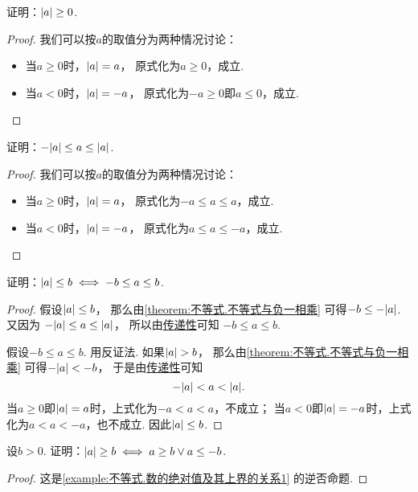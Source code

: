 \begin{example}
证明：\(\abs{a} \geq 0\).
\begin{proof}
我们可以按\(a\)的取值分为两种情况讨论：
\begin{itemize}
	\item 当\(a \geq 0\)时，\(\abs{a}=a\)，
	原式化为\(a \geq 0\)，成立.
	\item 当\(a < 0\)时，\(\abs{a}=-a\)，
	原式化为\(-a \geq 0\)即\(a \leq 0\)，成立.
	\qedhere
\end{itemize}
\end{proof}
\end{example}
\begin{example}\label{example:不等式.数及其绝对值的序}
证明：\(-\abs{a} \leq a \leq \abs{a}\).
\begin{proof}
我们可以按\(a\)的取值分为两种情况讨论：
\begin{itemize}
	\item 当\(a \geq 0\)时，\(\abs{a}=a\)，
	原式化为\(-a \leq a \leq a\)，成立.
	\item 当\(a < 0\)时，\(\abs{a}=-a\)，
	原式化为\(a \leq a \leq -a\)，成立.
	\qedhere
\end{itemize}
\end{proof}
\end{example}
\begin{example}\label{example:不等式.数的绝对值及其上界的关系1}
证明：\(\abs{a} \leq b
\iff
-b \leq a \leq b\).
\begin{proof}
假设\(\abs{a} \leq b\)，
那么由\cref{theorem:不等式.不等式与负一相乘}
可得\(-b \leq -\abs{a}\).
又因为 \hyperref[example:不等式.数及其绝对值的序]{\(-\abs{a} \leq a \leq \abs{a}\)}，
所以由\hyperref[theorem:不等式.不等式的对称性和传递性]{传递性}可知
\(-b \leq a \leq b\).

假设\(-b \leq a \leq b\).
用反证法.
如果\(\abs{a} > b\)，
那么由\cref{theorem:不等式.不等式与负一相乘}
可得\(-\abs{a} < -b\)，
于是由\hyperref[theorem:不等式.不等式的对称性和传递性]{传递性}可知\begin{equation*}
	-\abs{a} < a < \abs{a}.
\end{equation*}
当\(a\geq0\)即\(\abs{a} = a\)时，上式化为\(-a < a < a\)，不成立；
当\(a<0\)即\(\abs{a} = -a\)时，上式化为\(a < a < -a\)，也不成立.
因此\(\abs{a} \leq b\).
\end{proof}
\end{example}
\begin{example}\label{example:不等式.数的绝对值及其上界的关系2}
设\(b>0\).
证明：\(\abs{a} \geq b
\iff
a \geq b \lor a \leq -b\).
\begin{proof}
这是\cref{example:不等式.数的绝对值及其上界的关系1} 的逆否命题.
\end{proof}
\end{example}

